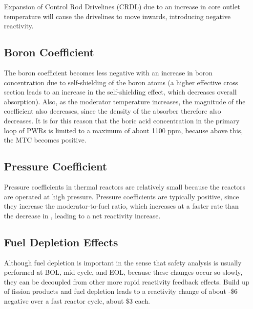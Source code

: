 \documentclass[10pt]{article}
\begin{document}
\begin{flushleft}
Expansion of Control Rod Drivelines (CRDL) due to an increase in core outlet temperature will cause the drivelines to move inwards, introducing negative reactivity.

\subsection{Boron Coefficient}

The boron coefficient becomes less negative with an increase in boron concentration due to self-shielding of the boron atoms (a higher effective cross section leads to an increase in the self-shielding effect, which decreases overall absorption). Also, as the moderator temperature increases, the magnitude of the coefficient also decreases, since the density of the absorber therefore also decreases. It is for this reason that the boric acid concentration in the primary loop of PWRs is limited to a maximum of about 1100 ppm, because above this, the MTC becomes positive.

\subsection{Pressure Coefficient}

Pressure coefficients in thermal reactors are relatively small because the reactors are operated at high pressure. Pressure coefficients are typically positive, since they increase the moderator-to-fuel ratio, which increases at a faster rate than the decrease in , leading to a net reactivity increase.

\subsection{Fuel Depletion Effects}

Although fuel depletion is important in the sense that safety analysis is usually performed at BOL, mid-cycle, and EOL, because these changes occur so slowly, they can be decoupled from other more rapid reactivity feedback effects. Build up of fission products and fuel depletion leads to a reactivity change of about -\$6 negative over a fast reactor cycle, about \$3 each. 





\clearpage


\clearpage









\end{flushleft}
\end{document}
